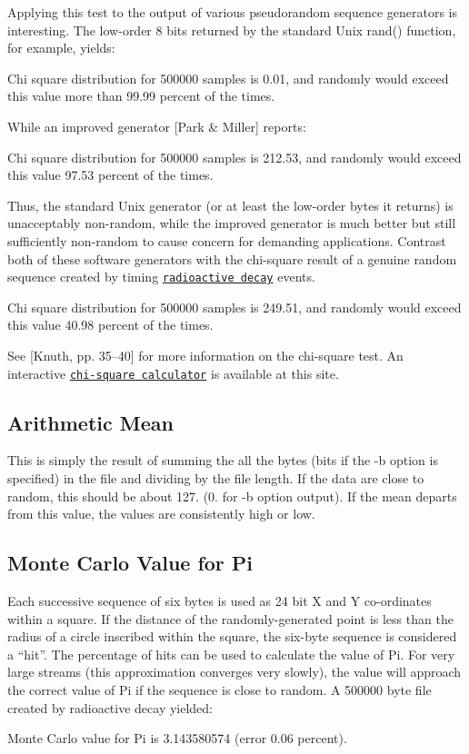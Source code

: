 Applying this test to the output of various pseudorandom sequence generators is interesting. The low-\/order 8 bits returned by the standard Unix rand() function, for example, yields\-: \begin{DoxyVerb}Chi square distribution for 500000 samples is 0.01, and randomly
would exceed this value more than 99.99 percent of the times.
\end{DoxyVerb}


While an improved generator \mbox{[}Park \& Miller\mbox{]} reports\-: \begin{DoxyVerb}Chi square distribution for 500000 samples is 212.53, and randomly
would exceed this value 97.53 percent of the times.
\end{DoxyVerb}


Thus, the standard Unix generator (or at least the low-\/order bytes it returns) is unacceptably non-\/random, while the improved generator is much better but still sufficiently non-\/random to cause concern for demanding applications. Contrast both of these software generators with the chi-\/square result of a genuine random sequence created by timing \href{http://www.fourmilab.ch/hotbits/}{\tt radioactive decay} events. \begin{DoxyVerb}Chi square distribution for 500000 samples is 249.51, and randomly
would exceed this value 40.98 percent of the times.
\end{DoxyVerb}


See \mbox{[}Knuth, pp. 35–40\mbox{]} for more information on the chi-\/square test. An interactive \href{http://www.fourmilab.ch/rpkp/experiments/analysis/chiCalc.html}{\tt chi-\/square calculator} is available at this site.

\subsection*{Arithmetic Mean}

This is simply the result of summing the all the bytes (bits if the -\/b option is specified) in the file and dividing by the file length. If the data are close to random, this should be about 127. (0. for -\/b option output). If the mean departs from this value, the values are consistently high or low.

\subsection*{Monte Carlo Value for Pi}

Each successive sequence of six bytes is used as 24 bit X and Y co-\/ordinates within a square. If the distance of the randomly-\/generated point is less than the radius of a circle inscribed within the square, the six-\/byte sequence is considered a “hit”. The percentage of hits can be used to calculate the value of Pi. For very large streams (this approximation converges very slowly), the value will approach the correct value of Pi if the sequence is close to random. A 500000 byte file created by radioactive decay yielded\-: \begin{DoxyVerb}Monte Carlo value for Pi is 3.143580574 (error 0.06 percent).
\end{DoxyVerb}


